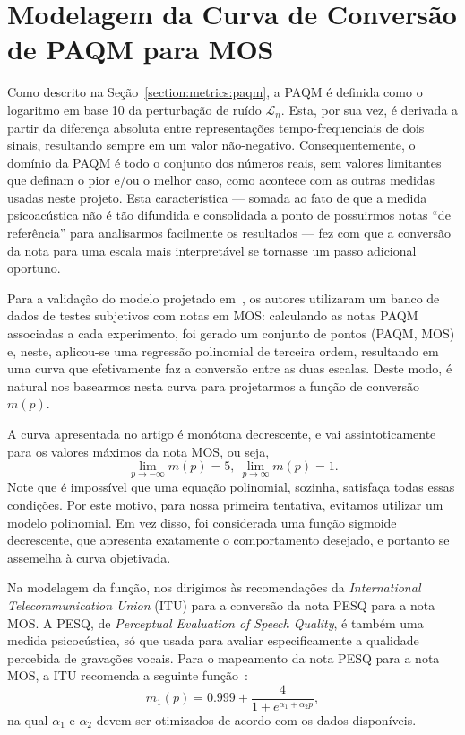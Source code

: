 \chapter{Modelagem da Curva de Conversão de PAQM para MOS}
\label{appendix:paqmtomos}

Como descrito na Seção~\ref{section:metrics:paqm}, a PAQM é definida como o logaritmo em base 10 da perturbação de ruído $\mathcal{L}_n$. Esta, por sua vez, é derivada a partir da diferença absoluta entre representações tempo-frequenciais de dois sinais, resultando sempre em um valor não-negativo. Consequentemente, o domínio da PAQM é todo o conjunto dos números reais, sem valores limitantes que definam o pior e/ou o melhor caso, como acontece com as outras medidas usadas neste projeto. Esta característica --- somada ao fato de que a medida psicoacústica não é tão difundida e consolidada a ponto de possuirmos notas ``de referência'' para analisarmos facilmente os resultados --- fez com que a conversão da nota para uma escala mais interpretável se tornasse um passo adicional oportuno.

Para a validação do modelo projetado em~\cite{beerends-2002}, os autores utilizaram um banco de dados de testes subjetivos com notas em MOS: calculando as notas PAQM associadas a cada experimento, foi gerado um conjunto de pontos (PAQM, MOS) e, neste, aplicou-se uma regressão polinomial de terceira ordem, resultando em uma curva que efetivamente faz a conversão entre as duas escalas. Deste modo, é natural nos basearmos nesta curva para projetarmos a função de conversão $m(p)$.

A curva apresentada no artigo é monótona decrescente, e vai assintoticamente para os valores máximos da nota MOS, ou seja,
\begin{equation}
    \lim_{p \to -\infty} m(p) = 5,\ \lim_{p \to \infty} m(p) = 1.
\end{equation}
Note que é impossível que uma equação polinomial, sozinha, satisfaça todas essas condições. Por este motivo, para nossa primeira tentativa, evitamos utilizar um modelo polinomial. Em vez disso, foi considerada uma função sigmoide decrescente, que apresenta exatamente o comportamento desejado, e portanto se assemelha à curva objetivada.

Na modelagem da função, nos dirigimos às recomendações da \textit{International Telecommunication Union} (ITU) para a conversão da nota PESQ para a nota MOS. A PESQ, de \textit{Perceptual Evaluation of Speech Quality}, é também uma medida psicocústica, só que usada para avaliar especificamente a qualidade percebida de gravações vocais. Para o mapeamento da nota PESQ para a nota MOS, a ITU recomenda a seguinte função~\cite{biscainho-2015}:
\begin{equation}
    m_1(p) = 0.999 + \frac{4}{1 + e^{\alpha_1 + \alpha_2 p}},
    \label{eq:paqmtomos:sigmoid2}
\end{equation}
na qual $\alpha_1$ e $\alpha_2$ devem ser otimizados de acordo com os dados disponíveis.

